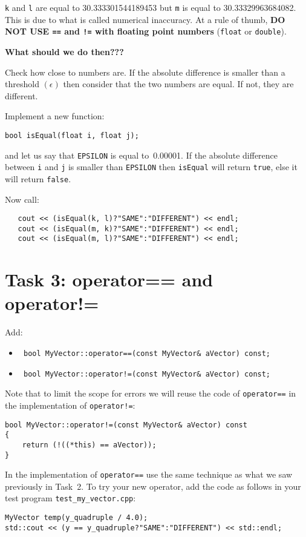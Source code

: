 \documentclass[english,a4paper,12pt,oneside]{article}
\begin{document}
\verb+k+ and \verb+l+ are equal to 30.333301544189453 but \verb+m+ is equal to 30.33329963684082. 
This is due to what is called numerical inaccuracy. 
At a rule of thumb, {\bf\large DO NOT USE \verb+==+ and \verb+!=+ with floating point numbers} (\verb+float+ or \verb+double+). 

\begin{center}{\bf What should we do then???}\end{center}

Check how close to numbers are. 
If the absolute difference is smaller than a threshold $(\epsilon)$ then consider that the two numbers are equal. 
If not, they are different. 

Implement a new function:
\begin{lstlisting}
bool isEqual(float i, float j);
\end{lstlisting}
and let us say that \verb+EPSILON+ is equal to~0.00001. 
If the absolute difference between \verb+i+ and \verb+j+ is smaller than \verb+EPSILON+ then \verb+isEqual+ will return \verb+true+, else it will return \verb+false+.

Now call:
\begin{lstlisting}
   cout << (isEqual(k, l)?"SAME":"DIFFERENT") << endl;
   cout << (isEqual(m, k)?"SAME":"DIFFERENT") << endl;
   cout << (isEqual(m, l)?"SAME":"DIFFERENT") << endl;
\end{lstlisting}

\section*{Task 3: operator== and operator!=}

Add:
\begin{itemize}
\item \verb+ bool MyVector::operator==(const MyVector& aVector) const;+
\item \verb+ bool MyVector::operator!=(const MyVector& aVector) const;+
\end{itemize}
Note that to limit the scope for errors we will reuse the code of \verb+operator==+ in the implementation of \verb+operator!=+:

\begin{lstlisting}
bool MyVector::operator!=(const MyVector& aVector) const
{
	return (!((*this) == aVector));
}
\end{lstlisting}
In the implementation of \verb+operator==+ use the same technique as what we saw previously in Task~2. 
To try your new operator, add the code as follows in your test program \verb+test_my_vector.cpp+:
\begin{lstlisting}
MyVector temp(y_quadruple / 4.0);
std::cout << (y == y_quadruple?"SAME":"DIFFERENT") << std::endl;
\end{lstlisting}
\end{document}
